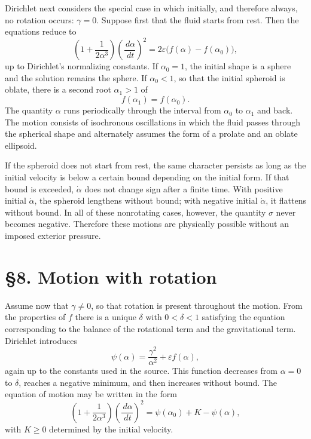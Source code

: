 \documentclass[11pt]{article}
\newcommand{\dd}{\,d}
\newcommand{\eps}{\varepsilon}
\begin{document}
Dirichlet next considers the special case in which initially, and therefore always, no rotation occurs: \(\gamma=0\).  Suppose first that the fluid starts from rest.  Then the equations reduce to
\begin{equation}
 \left(1+\frac{1}{2\alpha^3}\right)\left(\frac{\dd\alpha}{\dd t}\right)^2
 =2\eps\bigl(f(\alpha)-f(\alpha_0)\bigr),
\end{equation}
up to Dirichlet's normalizing constants.  If \(\alpha_0=1\), the initial shape is a sphere and the solution remains the sphere.  If \(\alpha_0<1\), so that the initial spheroid is oblate, there is a second root \(\alpha_1>1\) of
\[
 f(\alpha_1)=f(\alpha_0).
\]
The quantity \(\alpha\) runs periodically through the interval from \(\alpha_0\) to \(\alpha_1\) and back.  The motion consists of isochronous oscillations in which the fluid passes through the spherical shape and alternately assumes the form of a prolate and an oblate ellipsoid.

If the spheroid does not start from rest, the same character persists as long as the initial velocity is below a certain bound depending on the initial form.  If that bound is exceeded, \(\dot\alpha\) does not change sign after a finite time.  With positive initial \(\dot\alpha\), the spheroid lengthens without bound; with negative initial \(\dot\alpha\), it flattens without bound.  In all of these nonrotating cases, however, the quantity \(\sigma\) never becomes negative.  Therefore these motions are physically possible without an imposed exterior pressure.

\section*{\S8. Motion with rotation}

Assume now that \(\gamma\ne0\), so that rotation is present throughout the motion.  From the properties of \(f\) there is a unique \(\delta\) with \(0<\delta<1\) satisfying the equation corresponding to the balance of the rotational term and the gravitational term.  Dirichlet introduces
\[
 \psi(\alpha)=\frac{\gamma^2}{\alpha^2}+\eps f(\alpha),
\]
again up to the constants used in the source.  This function decreases from \(\alpha=0\) to \(\delta\), reaches a negative minimum, and then increases without bound.  The equation of motion may be written in the form
\begin{equation}
 \left(1+\frac{1}{2\alpha^3}\right)
 \left(\frac{\dd\alpha}{\dd t}\right)^2
 =\psi(\alpha_0)+K-\psi(\alpha),
\end{equation}
with \(K\ge0\) determined by the initial velocity.
\end{document}
